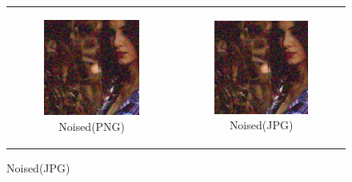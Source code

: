 \begin{figure}
\begin{tabular}{cc}
    \begin{subfigure}{0.3\textwidth}
      \includegraphics[width=\linewidth]{inc/research/formats/noised_png.png}
      \caption{Noised(PNG)}
    \end{subfigure} &
    \begin{subfigure}{0.3\textwidth}
      \includegraphics[width=\linewidth]{inc/research/formats/noised_jpg.png}
      \caption{Noised(JPG)}
    \end{subfigure} \\
    

\end{tabular}
\end{figure}
